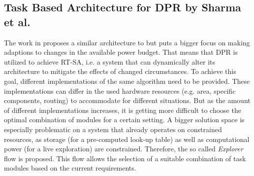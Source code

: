 \subsection{Task Based Architecture for \gls{DPR} by Sharma et al.}\label{sec:TaskBasedArchitectureSharma}
The work in \cite{sharma_run-time_2018} proposes a similar architecture to \cite{wang_dynamic_2018} but puts a bigger focus on making adaptions to changes in the available power budget.
That means that \gls{DPR} is utilized to achieve \gls{RT-SA}, i.e. a system that can dynamically alter its architecture to mitigate the effects of changed circumstances.
To achieve this goal, different implementations of the same algorithm need to be provided.
These implementations can differ in the used hardware resources (e.g. area, specific components, routing) to accommodate for different situations.
But as the amount of different implementations increases, it is getting more difficult to choose the optimal combination of modules for a certain setting.
A bigger solution space is especially problematic on a system that already operates on constrained resources, as storage (for a pre-computed look-up table) as well as computational power (for a live exploration) are constrained. 
Therefore, the so called \textit{Explorer} flow is proposed.
This flow allows the selection of a suitable combination of task modules based on the current requirements.
